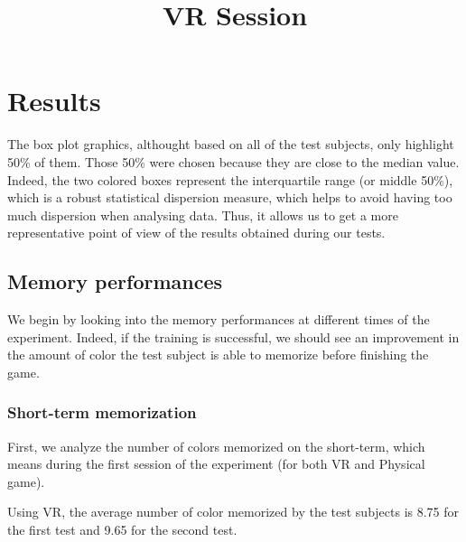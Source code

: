 \documentclass[12pt, openany, twocolumn]{article}
\begin{document}
\section{Results}
    
   
The box plot graphics, althought based on all of the test subjects, only highlight 50\% of them. Those 50\% were chosen because they are close to the median value. 
Indeed, the two colored boxes represent the interquartile range (or middle 50\%), which is a robust statistical dispersion measure, which helps to avoid having too much dispersion when analysing data. Thus, it allows us to get a more representative point of view of the results obtained during our tests. 
\\

    \subsection{Memory performances}
    We begin by looking into the memory performances at different times of the experiment.
    Indeed, if the training is successful, we should see an improvement in the amount of color the test subject is able to memorize before finishing the game.
    \\

        \subsubsection{Short-term memorization}
        First, we analyze the number of colors memorized on the short-term, which means during the first session of the experiment (for both VR and Physical game).
        \\
     
            \noindent \title{\textbf{VR Session}} \vspace{0.25cm}

            Using VR, the average number of color memorized by the test subjects is 8.75 for the first test and 9.65 for the second test.
\end{document}
